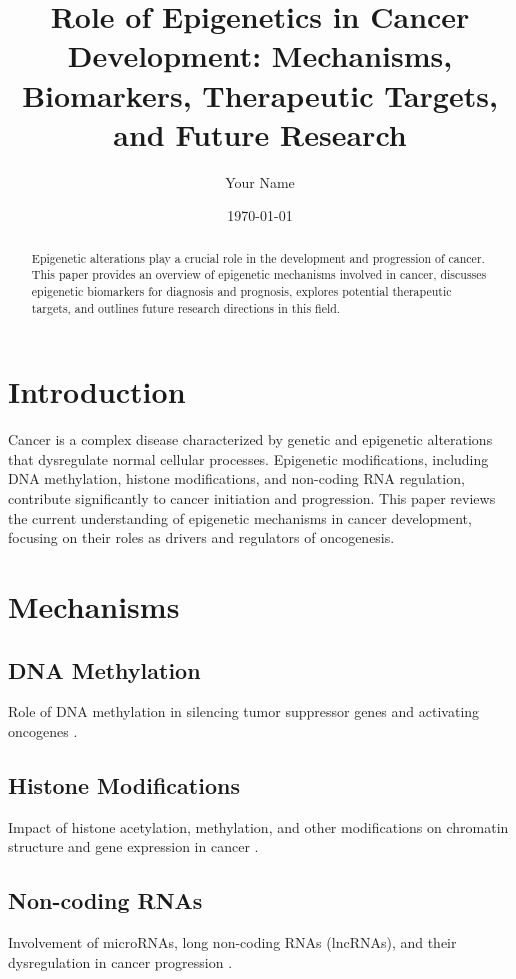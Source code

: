 \documentclass[12pt]{article}
\title{Role of Epigenetics in Cancer Development: Mechanisms, Biomarkers, Therapeutic Targets, and Future Research}
\author{Your Name}
\date{\today}
\begin{document}
\maketitle

\begin{abstract}
Epigenetic alterations play a crucial role in the development and progression of cancer. This paper provides an overview of epigenetic mechanisms involved in cancer, discusses epigenetic biomarkers for diagnosis and prognosis, explores potential therapeutic targets, and outlines future research directions in this field.
\end{abstract}

\section{Introduction}
Cancer is a complex disease characterized by genetic and epigenetic alterations that dysregulate normal cellular processes. Epigenetic modifications, including DNA methylation, histone modifications, and non-coding RNA regulation, contribute significantly to cancer initiation and progression. This paper reviews the current understanding of epigenetic mechanisms in cancer development, focusing on their roles as drivers and regulators of oncogenesis.

\section{Mechanisms}
\subsection{DNA Methylation}
Role of DNA methylation in silencing tumor suppressor genes and activating oncogenes \citep{jones2016dna, baylin2011dna}.

\subsection{Histone Modifications}
Impact of histone acetylation, methylation, and other modifications on chromatin structure and gene expression in cancer \citep{chi2010histone, dawson2012cancer}.

\subsection{Non-coding RNAs}
Involvement of microRNAs, long non-coding RNAs (lncRNAs), and their dysregulation in cancer progression \citep{esteller2011noncoding, lin2013noncoding}.
\end{document}
